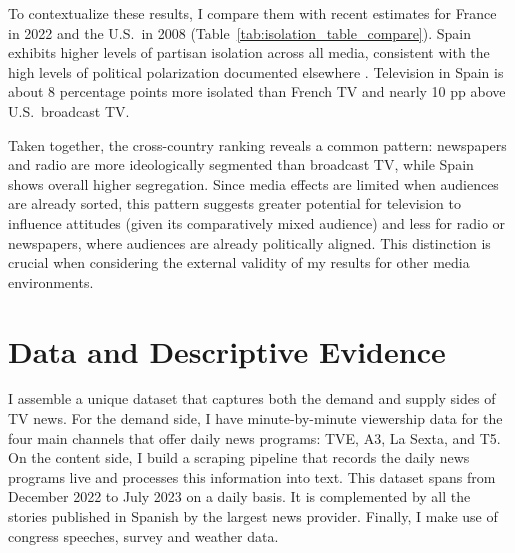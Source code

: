 \documentclass[12pt]{article}
\begin{document}
	
	To contextualize these results, I compare them with recent estimates for France in 2022 \citep{Dejean2022PartisanSE} and the U.S.\ in 2008 \citep{gentzkow_isolation} (Table~\ref{tab:isolation_table_compare}). Spain exhibits higher levels of partisan isolation across all media, consistent with the high levels of political polarization documented elsewhere \citep{edelman_trust_2023}.
	Television in Spain is about 8 percentage points more isolated than  French TV and nearly 10 pp above U.S.\ broadcast TV.
	
	Taken together, the cross-country ranking reveals a common pattern: newspapers and radio are more ideologically segmented than broadcast TV, while Spain shows overall higher segregation. Since media effects are limited when audiences are already sorted, this pattern suggests greater potential for television to influence attitudes (given its comparatively mixed audience) and less for radio or newspapers, where audiences are already politically aligned. This distinction is crucial when considering the external validity of my results for other media environments.
	
	
	

	
	
	\section{Data and Descriptive Evidence}
	\label{sec:data}

	I assemble a unique dataset that captures both the demand and supply sides of TV news. For the demand side, I have minute-by-minute viewership data for the four main channels that offer daily news programs: TVE, A3, La Sexta, and T5. On the content side, I build a scraping pipeline that records the daily news programs live and processes this information into text. This dataset spans from December 2022 to July 2023 on a daily basis. It is complemented by all the stories published in Spanish by the largest news provider. Finally, I make use of congress speeches, survey and weather data.
	
\end{document}
